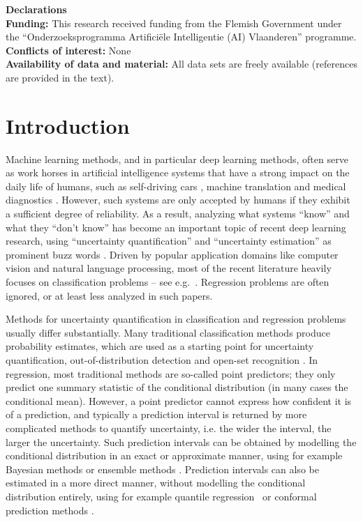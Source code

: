 \documentclass[smallcondensed]{svjour3}
\begin{document}
\textbf{Declarations}\\
\textbf{Funding:} This research received funding from the Flemish Government under the ``Onderzoeksprogramma Artificiële Intelligentie (AI) Vlaanderen'' programme.\\
\textbf{Conflicts of interest:} None\\
\textbf{Availability of data and material:} All data sets are freely available (references are provided in the text).

\section{Introduction}

    Machine learning methods, and in particular deep learning methods,  often serve as work horses in artificial intelligence systems that have a strong impact on the daily life of humans, such as self-driving cars  \cite{chen2017end,michelmore2018evaluating}, machine translation \cite{ott2018analyzing,singh2017machine} and medical diagnostics \cite{fang2018quantile,jiang2012calibrating}. However, such systems are only accepted by humans if they exhibit a sufficient degree of reliability. As a result, analyzing what systems ``know'' and what they ``don't know'' has become an important topic of recent deep learning research, using ``uncertainty quantification'' and ``uncertainty estimation'' as prominent buzz words \cite{NEURIPS2019_1cc8a8ea,malinin2018predictive,teye2018bayesian,van2020uncertainty}. Driven by popular application domains like computer vision and natural language processing, most of the recent literature heavily focuses on classification problems -- see e.g.\ \cite{guo2017calibration,hein2019relu,naeini2015obtaining,van2020uncertainty}. Regression problems are often ignored, or at least less analyzed in such papers.

    Methods for uncertainty quantification in classification and regression problems usually differ substantially. Many traditional classification methods produce probability estimates, which are used as a starting point for uncertainty quantification, out-of-distribution detection and open-set recognition \cite{9040673}. In regression, most traditional methods are so-called point predictors; they only predict one summary statistic of the conditional distribution (in many cases the conditional mean). However, a point predictor cannot express how confident it is of a prediction, and typically a prediction interval is returned by more complicated methods to quantify uncertainty, i.e. the wider the interval, the larger the uncertainty. Such prediction intervals can be obtained by modelling the conditional distribution in an exact or approximate manner, using for example Bayesian methods \cite{goan2020bayesian,williams1996gaussian} or ensemble methods \cite{kendallgal,oob_rf}. Prediction intervals can also be estimated in a more direct manner, without modelling the conditional distribution entirely, using for example quantile regression~\cite{koenker2001quantile} or conformal prediction methods \cite{romano2019conformalized,cp_all}.
\end{document}
